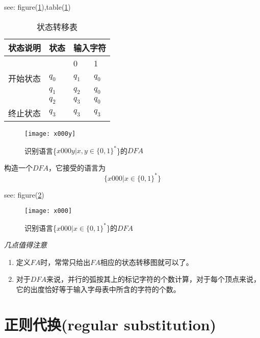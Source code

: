 \begin{example}
	see: figure(\ref{fig:x000y}),table(\ref{tab:x000y})
	\begin{table}
		\caption{状态转移表}
		\label{tab:x000y}       %
		\begin{tabular}{|p{1.3cm}|p{0.7cm}|p{0.7cm}|p{0.7cm}|}
			\hline 
			状态说明 & 状态 & \multicolumn{2}{c|}{输入字符} \\ 
			\hline 
			&  & 0 & 1 \\ 
			\hline 
			开始状态 & $q_0$ & $q_1$ & $q_0$ \\ 
			\hline 
			& $q_1$ & $q_2$ & $q_0$ \\ 
			\hline 
			& $q_2$ & $q_3$ & $q_0$ \\ 
			\hline 
			终止状态 & $q_3$ & $q_3$ & $q_3$ \\ 
			\hline 
		\end{tabular} 
    \end{table}
    \begin{figure}[htbp]
    	\texttt{[image: x000y]}
    	\caption{识别语言\{$x000y|x,y\in\{0,1\}^{\ast}$\}的$DFA$}
    	\label{fig:x000y}       %
    \end{figure}
\end{example}

\begin{example}构造一个$DFA$，它接受的语言为
	\[\{x000|x\in\{0,1\}^{\ast}\}\]
	
	see: figure(\ref{fig:x000})
	\begin{figure}[htbp]
		\texttt{[image: x000]}
		\caption{识别语言\{$x000|x\in\{0,1\}^{\ast}$\}的$DFA$}
		\label{fig:x000}       %
	\end{figure}
\end{example}

\begin{note}\emph{几点值得注意}
	\begin{enumerate}
		\item 定义$FA$时，常常只给出$FA$相应的状态转移图就可以了。 
		\item 对于$DFA$来说，并行的弧按其上的标记字符的个数计算，对于每个顶点来说，它的出度恰好等于输入字母表中所含的字符的个数。 
		
	\end{enumerate}
\end{note}

\section{正则代换(regular substitution)}

